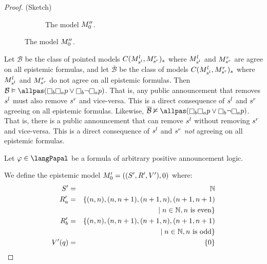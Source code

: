 \begin{proof}{(Sketch)}
\begin{figure}
\begin{subfigure}[t]{\linewidth}
        \caption{The model $\kPModel[\prime\prime]{0}$.}\label{expressivity-s5-3}
    \end{subfigure}
\end{figure}

Let $\mathcal{B}$ be the class of pointed models $C(\kPModel[l]{\kStateS[l]},\kPModel[r]{\kStateS[r]})_{\kStateS}$ where $\kPModel[l]{\kStateS[l]}$ and $\kPModel[r]{\kStateS[r]}$ are agree on all epistemic formulas, and let $\overline{\mathcal{B}}$ be the class of models $C(\kPModel[l]{\kStateS[l]},\kPModel[r]{\kStateS[r]})_{\kStateS}$ where $\kPModel[l]{\kStateS[l]}$ and $\kPModel[r]{\kStateS[r]}$ do not agree on all epistemic formulas. 
Then $\mathcal{B} \entails \allpas(\knowsB \knowsA \atomP \lor \knowsB \neg \knowsA \atomP)$.
That is, any public announcement that removes $\kStateS[l]$ must also remove $\kStateS[r]$ and vice-versa. 
This is a direct consequence of $\kStateS[l]$ and $\kStateS[r]$ agreeing on all epistemic formulas.
Likewise, $\overline{\mathcal{B}} \nentails \allpas(\knowsB \knowsA \atomP \lor \knowsB \neg \knowsA \atomP)$.
That is, there is a public announcement that can remove $\kStateS[l]$ without removing $\kStateS[r]$ and vice-versa.
This is a direct consequence of $\kStateS[l]$ and $\kStateS[r]$ {\em not} agreeing on all epistemic formulas.

Let $\phi \in \langPapal$ be a formula of arbitrary positive announcement logic.

We define the epistemic model $\kPModelAndTupleP{0}$ where:
\begin{eqnarray*}
    \kStatesP &=& \naturals\\
    \kAccessibilityP{\agentA} &=& \{(n, n), (n, n + 1), (n + 1, n), (n + 1, n + 1) \\&&\quad \mid n \in \naturals, n \text{ is even}\}\\
    \kAccessibilityP{\agentB} &=& \{(n, n), (n, n + 1), (n + 1, n), (n + 1, n + 1) \\&&\quad \mid n \in \naturals, n \text{ is odd}\}\\
    \kValuationP(\atomQ) &=& \{0\}
\end{eqnarray*}


\end{proof}
